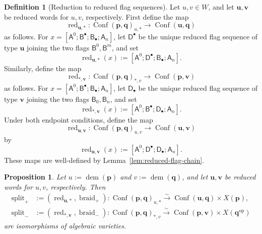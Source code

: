 \documentclass[10pt,a4paper]{article}
\newtheorem{proposition}[theorem]{Proposition}
\theoremstyle{definition}
\newtheorem{definition}[theorem]{Definition}
\theoremstyle{remark}
\newcommand{\flagA}{\mathsf{A}}
\newcommand{\flagB}{\mathsf{B}}
\newcommand{\flagD}{\mathsf{D}}
\newcommand{\Conf}{\operatorname{Conf}}
\newcommand{\Split}{\operatorname{split}}
\begin{document}
\begin{definition}[Reduction to reduced flag sequences]
\label{def:double-reduction}
Let \(u,v\in W\), and let \(\mathbf u,\mathbf v\) be reduced words for
\(u,v\), respectively.  First define the map
\[
 \operatorname{red}_{\mathbf u,*}:
 \Conf(\mathbf p,\mathbf q)_{u,*}
 \longrightarrow\Conf(\mathbf u,\mathbf q)
\]
as follows.  For
\(x=[\flagA^0;\flagB^\bullet;\flagB_\bullet;\flagA_n]\), let
\(\flagD^\bullet\) be the unique reduced flag sequence of type \(\mathbf u\)
joining the two flags \(\flagB^0,\flagB^m\), and set
\[
 \operatorname{red}_{\mathbf u,*}(x)
 :=[\flagA^0;\flagD^\bullet;\flagB_\bullet;\flagA_n].
\]
Similarly, define the map
\[
 \operatorname{red}_{*,\mathbf v}:
 \Conf(\mathbf p,\mathbf q)_{*,v}
 \longrightarrow\Conf(\mathbf p,\mathbf v)
\]
as follows.  For
\(x=[\flagA^0;\flagB^\bullet;\flagB_\bullet;\flagA_n]\), let
\(\flagD_\bullet\) be the unique reduced flag sequence of type \(\mathbf v\)
joining the two flags \(\flagB_0,\flagB_n\), and set
\[
 \operatorname{red}_{*,\mathbf v}(x)
 :=[\flagA^0;\flagB^\bullet;\flagD_\bullet;\flagA_n].
\]
Under both endpoint conditions, define the map
\[
 \operatorname{red}_{\mathbf u,\mathbf v}:
 \Conf(\mathbf p,\mathbf q)_{u,v}
 \longrightarrow\Conf(\mathbf u,\mathbf v)
\]
by
\[
 \operatorname{red}_{\mathbf u,\mathbf v}(x)
 :=[\flagA^0;\flagD^\bullet;\flagD_\bullet;\flagA_n].
\]
These maps are well-defined by Lemma~\ref{lem:reduced-flag-chain}.
\end{definition}

\begin{proposition}
\label{prop:one-sided-flag-product}
Let \(u:=\operatorname{dem}(\mathbf p)\) and
\(v:=\operatorname{dem}(\mathbf q)\), and let \(\mathbf u,\mathbf v\) be
reduced words for \(u,v\), respectively.  Then
\begin{align}
 \Split_+
 &:=(\operatorname{red}_{\mathbf u,*},\operatorname{braid}_+):
 \Conf(\mathbf p,\mathbf q)_{u,*}
 \xrightarrow{\sim}
 \Conf(\mathbf u,\mathbf q)\times X(\mathbf p),
 \label{eq:plus-one-sided-split}\\
 \Split_-
 &:=(\operatorname{red}_{*,\mathbf v},\operatorname{braid}_-):
 \Conf(\mathbf p,\mathbf q)_{*,v}
 \xrightarrow{\sim}
 \Conf(\mathbf p,\mathbf v)
 \times X(\mathbf q^{\mathrm{op}})
 \label{eq:minus-one-sided-split}
\end{align}
are isomorphisms of algebraic varieties.
\end{proposition}
\end{document}
